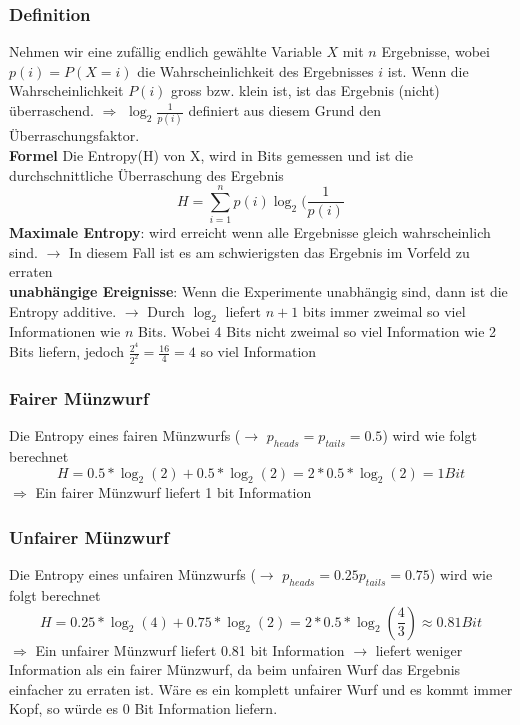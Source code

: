 \documentclass{report}
\theoremstyle{definition}
\theoremstyle{example}
\begin{document}
		\subsubsection{Definition}
Nehmen wir eine zufällig endlich gewählte Variable $X$ mit $n$ Ergebnisse, wobei $p(i) = P(X=i)$ die Wahrscheinlichkeit des Ergebnisses $i$ ist. Wenn die Wahrscheinlichkeit $P(i)$ gross bzw. klein ist, ist das Ergebnis (nicht) überraschend. $\Rightarrow$ $\log_2 \frac{1}{p(i)}$ definiert aus diesem Grund den Überraschungsfaktor.\\
\textbf{Formel} Die Entropy(H) von X, wird in Bits gemessen und ist die durchschnittliche Überraschung des Ergebnis\\
\begin{equation}
	H = \sum_{i=1}^n p(i) \log_2(\frac{1}{p(i)}
\end{equation}
\textbf{Maximale Entropy}: wird erreicht wenn alle Ergebnisse gleich wahrscheinlich sind. $\rightarrow$ In diesem Fall ist es am schwierigsten das Ergebnis im Vorfeld zu erraten\\
\textbf{unabhängige Ereignisse}: Wenn die Experimente unabhängig sind, dann ist die Entropy additive. $\rightarrow$ Durch $\log_2$ liefert $n+1$ bits immer zweimal so viel Informationen wie $n$ Bits. Wobei 4 Bits nicht zweimal so viel Information wie 2 Bits liefern, jedoch $\frac{2^4}{2^2} = \frac{16}{4} = 4$ so viel Information

		\subsubsection{Fairer Münzwurf}
Die Entropy eines fairen Münzwurfs ($\rightarrow$ $p_{heads} = p_{tails} = 0.5$) wird wie folgt berechnet
\begin{equation}
	H = 0.5 * \log_2(2) + 0.5 * \log_2(2) = 2 * 0.5 *\log_2(2) = 1 Bit
\end{equation}
$\Rightarrow$ Ein fairer Münzwurf liefert 1 bit Information

		\subsubsection{Unfairer Münzwurf}
Die Entropy eines unfairen Münzwurfs ($\rightarrow$ $p_{heads} = 0.25 p_{tails} = 0.75$) wird wie folgt berechnet
\begin{equation}
	H = 0.25 * \log_2(4) + 0.75 * \log_2(2) = 2 * 0.5 *\log_2(\frac{4}{3}) \approx 0.81 Bit
\end{equation}
$\Rightarrow$ Ein unfairer Münzwurf liefert 0.81 bit Information $\rightarrow$ liefert weniger Information als ein fairer Münzwurf, da beim unfairen Wurf das Ergebnis einfacher zu erraten ist. Wäre es ein komplett unfairer Wurf und es kommt immer Kopf, so würde es 0 Bit Information liefern.
\end{document}
